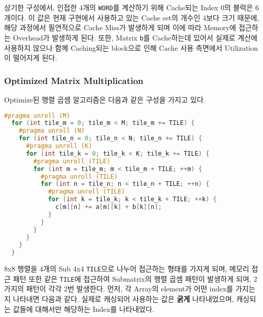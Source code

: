 \documentclass{scrartcl}
\begin{document}
상기한 구성에서, 인접한 4개의 \texttt{WORD}를 계산하기 위해 Cache되는 Index 0의 블럭은 6개이다. 이 값은 현재 구현에서 사용하고 있는 Cache set의 개수인 4보다 크기 때문에,
해당 과정에서 필연적으로 Cache Miss가 발생하게 되며 이에 따라 Memory에 접근하는 Overhead가 발생하게 된다.
또한, Matrix \texttt{b}를 Cache하는데 있어서 실제로 계산에 사용하지 않으나 함께 Caching되는 block으로 인해 Cache 사용 측면에서 Utilization이 떨어지게 된다.

\subsubsection{Optimized Matrix Multiplication}

Optimize된 행렬 곱셈 알고리즘은 다음과 같은 구성을 가지고 있다.
\begin{lstlisting}[language=c]
  #pragma unroll (M)
  for (int tile_m = 0; tile_m < M; tile_m += TILE) {
    #pragma unroll (N)
    for (int tile_n = 0; tile_n < N; tile_n += TILE) {
      #pragma unroll (K)
      for (int tile_k = 0; tile_k < K; tile_k += TILE) {
        #pragma unroll (TILE)
        for (int m = tile_m; m < tile_m + TILE; ++m) {
          #pragma unroll (TILE)
          for (int n = tile_n; n < tile_n + TILE; ++n) {
            #pragma unroll (TILE)
            for (int k = tile_k; k < tile_k + TILE; ++k) {
              c[m][n] += a[m][k] + b[k][n];
            }
          }
        }
      }
    }
  }
\end{lstlisting}

8x8 행렬을 4개의 Sub 4x4 \texttt{TILE}으로 나누어 접근하는 형태를 가지게 되며, 메모리 접근 패턴 또한 같은 \texttt{TILE}에 접근하여 Submatrix의 행렬 곱셈 패턴이 발생하게 되며, 2가지의 패턴이 각각 2번 발생한다.
먼저, 각 Array의 element가 어떤 index를 가지는 지 나타내면 다음과 같다. 실제로 캐싱되어 사용하는 값은 \textbf{굵게} 나타내었으며, 캐싱되는 값들에 대해서만 해당하는 Index를 나타내었다.
\end{document}
